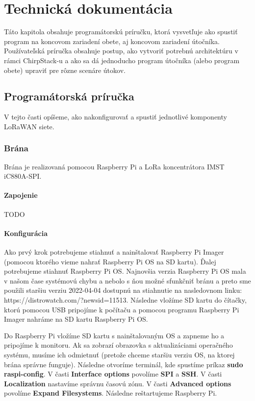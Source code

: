 \chapter{Technická dokumentácia}
Táto kapitola obsahuje programátorskú príručku, ktorá vysvetľuje ako spustiť program na koncovom zariadení obete, aj koncovom zariadení útočníka. Používateľská príručka obsahuje postup, ako vytvoriť potrebnú architektúru v rámci ChirpStack-u a ako sa dá jednoducho program útočníka (alebo program obete) upraviť pre rôzne scenáre útokov.

\section{Programátorská príručka}

V tejto časti opíšeme, ako nakonfigurovať a spustiť jednotlivé komponenty LoRaWAN siete.

\subsection{Brána}

Brána je realizovaná pomocou Raspberry Pi a LoRa koncentrátora IMST iC880A-SPI.

\subsubsection{Zapojenie}

TODO

\subsubsection{Konfigurácia}

Ako prvý krok potrebujeme stiahnuť a nainštalovať Raspberry Pi Imager (pomocou ktorého vieme nahrať Raspberry Pi OS na SD kartu). Ďalej potrebujeme stiahnuť Raspberry Pi OS. Najnovšia verzia Raspberry Pi OS mala v našom čase systémovú chybu a nebolo s ňou možné sfunkčniť bránu a preto sme použili staršiu verziu 2022-04-04 dostupnú na stiahnutie na nasledovnom linku: https://distrowatch.com/?newsid=11513. Následne vložíme SD kartu do čítačky, ktorú pomocou USB pripojíme k počítaču a pomocou programu Raspberry Pi Imager nahráme na SD kartu Raspberry Pi OS. 

Do Raspberry Pi vložíme SD kartu s nainštalovaným OS a zapneme ho a pripojíme k monitoru. Ak sa zobrazí obrazovka s aktualizáciami operačného systému, musíme ich odmietnuť (pretože chceme staršiu verziu OS, na ktorej brána správne funguje). Následne otvoríme terminál, kde spustíme príkaz \textbf{sudo raspi-config}. V časti \textbf{Interface options} povolíme \textbf{SPI} a \textbf{SSH}. V časti \textbf{Localization} nastavíme správnu časovú zónu. V časti \textbf{Advanced options} povolíme \textbf{Expand Filesystems}. Následne reštartujeme Raspberry Pi.

